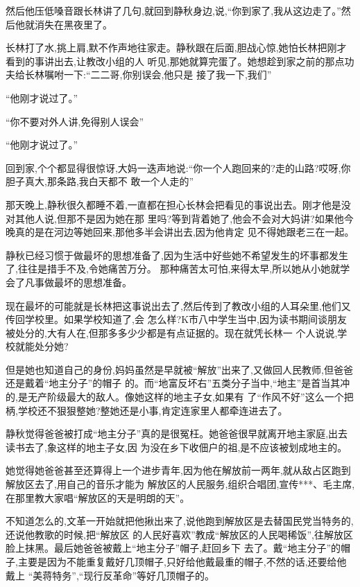 ﻿\documentclass[12pt]{article}
\begin{document}
然后他压低嗓音跟长林讲了几句,就回到静秋身边,说,``你到家了,我从这边走了。''然后他就消失在黑夜里了。

长林打了水,挑上肩,默不作声地往家走。静秋跟在后面,胆战心惊,她怕长林把刚才看到的事讲出去,让教改小组的人
听见,那她就算完蛋了。她想趁到家之前的那点功夫给长林嘱咐一下:``二\myrule 二哥,你别误会,他只是\myrule 
接了我一下,我们\myrule ''

``他刚才说过了。''

``你不要对外人讲,免得别人误会\myrule ''

``他刚才说过了。''

回到家,个个都显得很惊讶,大妈一迭声地说:``你一个人跑回来的?走的山路?哎呀,你胆子真大,那条路,我白天都不
敢一个人走的\myrule ''

那天晚上,静秋很久都睡不着,一直都在担心长林会把看见的事说出去。刚才他是没对其他人说,但那不是因为她在那
里吗?等到背着她了,他会不会对大妈讲?如果他今晚真的是在河边等她回来,那他\myrule 多半会讲出去,因为他肯定
见不得她跟老三在一起。

静秋已经习惯于做最坏的思想准备了,因为生活中好些她不希望发生的坏事都发生了,往往是措手不及,令她痛苦万分。
那种痛苦太可怕,来得太早,所以她从小她就学会了凡事做最坏的思想准备。

现在最坏的可能就是长林把这事说出去了,然后传到了教改小组的人耳朵里,他们又传回学校里。如果学校知道了,会
怎么样?K市八中学生当中,因为读书期间谈朋友被处分的,大有人在,但那多多少少都是有点证据的。现在就凭长林一
个人说说,学校就能处分她?

但是她也知道自己的身份,妈妈虽然是早就被``解放''出来了,又做回人民教师,但爸爸还是戴着``地主分子''的帽子
的。而``地富反坏右''五类分子当中,``地主''是首当其冲的,是无产阶级最大的敌人。像她这样的地主子女,如果有
了``作风不好''这么一个把柄,学校还不狠狠整她?整她还是小事,肯定连家里人都牵连进去了。

静秋觉得爸爸被打成``地主分子''真的是很冤枉。她爸爸很早就离开地主家庭,出去读书去了,象这样的地主子女,因
为没在乡下收佃户的祖,是不应该被划成地主的。

她觉得她爸爸甚至还算得上一个进步青年,因为他在解放前一两年,就从敌占区跑到解放区去了,用自己的音乐才能为
解放区的人民服务,组织合唱团,宣传***、毛主席,在那里教大家唱``解放区的天是明朗的天''。

不知道怎么的,文革一开始就把他揪出来了,说他跑到解放区是去替国民党当特务的,还说他教歌的时候,把``解放区
的人民好喜欢''教成``解放区的人民喝稀饭'',往解放区脸上抹黑。最后她爸爸被戴上``地主分子''帽子,赶回乡下
去了。戴``地主分子''的帽子,主要是因为不能重复戴好几顶帽子,只好给他戴最重的帽子,不然的话,还要给他戴上
``美蒋特务'',``现行反革命''等好几顶帽子的。
\end{document}
